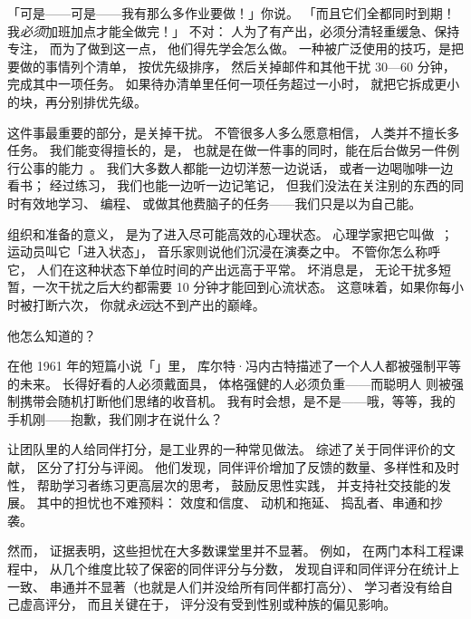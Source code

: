 「可是——可是——我有那么多作业要做！」你说。
「而且它们全都同时到期！
我\emph{必须}加班加点才能全做完！」
不对：
人为了有产出，必须分清轻重缓急、保持专注，
而为了做到这一点，
他们得先学会怎么做。
一种被广泛使用的技巧，是把要做的事情列个清单，
按优先级排序，
然后关掉邮件和其他干扰 30—60 分钟，
完成其中一项任务。
如果待办清单里任何一项任务超过一小时，
就把它拆成更小的块，再分别排优先级。

这件事最重要的部分，是关掉干扰。
不管很多人多么愿意相信，
人类并不擅长多任务。
我们能变得擅长的，是，
也就是在做一件事的同时，能在后台做另一件例行公事的能力~\cite{Mill2016a}。
我们大多数人都能一边切洋葱一边说话，
或者一边喝咖啡一边看书；
经过练习，
我们也能一边听一边记笔记，
但我们没法在关注别的东西的同时有效地学习、
编程、
或做其他费脑子的任务——我们只是以为自己能。

组织和准备的意义，
是为了进入尽可能高效的心理状态。
心理学家把它叫做~\cite{Csik2008}；
运动员叫它「进入状态」，
音乐家则说他们沉浸在演奏之中。
不管你怎么称呼它，
人们在这种状态下单位时间的产出远高于平常。
坏消息是，
无论干扰多短暂，一次干扰之后大约都需要 10 分钟才能回到心流状态。
这意味着，如果你每小时被打断六次，
你就\emph{永远}达不到产出的巅峰。

\newpage

\begin{aside}{他怎么知道的？}

  在他 1961 年的短篇小说「」里，
  库尔特·冯内古特描述了一个人人都被强制平等的未来。
  长得好看的人必须戴面具，
  体格强健的人必须负重——而聪明人
  则被强制携带会随机打断他们思绪的收音机。
  我有时会想，是不是——哦，等等，我的手机刚——抱歉，我们刚才在说什么？

\end{aside}


让团队里的人给同伴打分，是工业界的一种常见做法。
\cite{Sond2012}综述了关于同伴评价的文献，
区分了打分与评阅。
他们发现，同伴评价增加了反馈的数量、多样性和及时性，
帮助学习者练习更高层次的思考，
鼓励反思性实践，
并支持社交技能的发展。
其中的担忧也不难预料：
效度和信度、
动机和拖延、
捣乱者、串通和抄袭。

然而，
证据表明，这些担忧在大多数课堂里并不显著。
例如，
\cite{Kauf2000}在两门本科工程课程中，
从几个维度比较了保密的同伴评分与分数，
发现自评和同伴评分在统计上一致、
串通并不显著（也就是人们并没给所有同伴都打高分）、
学习者没有给自己虚高评分，
而且关键在于，
评分没有受到性别或种族的偏见影响。

